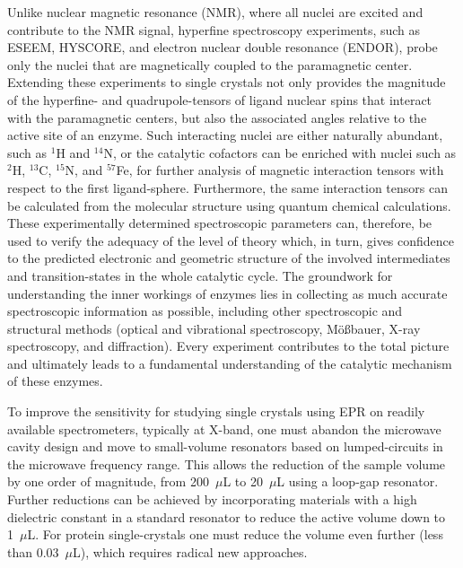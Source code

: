 Unlike nuclear magnetic resonance (NMR), where all nuclei are excited and contribute to the NMR signal, hyperfine spectroscopy experiments, such as ESEEM, HYSCORE, and electron nuclear double resonance (ENDOR), probe only the nuclei that are magnetically coupled to the paramagnetic center. Extending these experiments to single crystals not only provides the magnitude of the hyperfine- and quadrupole-tensors of ligand nuclear spins that interact with the paramagnetic centers, but also the associated angles relative to the active site of an enzyme. Such interacting nuclei are either naturally abundant, such as $^1$H and $^{14}$N, or the catalytic cofactors can be enriched with nuclei such as $^2$H, $^{13}$C, $^{15}$N, and $^{57}$Fe, for further analysis of magnetic interaction tensors with respect to the first ligand-sphere. Furthermore, the same interaction tensors can be calculated from the molecular structure using quantum chemical calculations. \cite{NEESE2003125} These experimentally determined spectroscopic parameters can, therefore, be used to verify the adequacy of the level of theory which, in turn, gives confidence to the predicted electronic and geometric structure of the involved intermediates and transition-states in the whole catalytic cycle. The groundwork for understanding the inner workings of enzymes lies in collecting as much accurate spectroscopic information as possible, including other spectroscopic and structural methods (optical and vibrational spectroscopy, M{\"o}{\ss}bauer, X-ray spectroscopy, and diffraction). Every experiment contributes to the total picture and ultimately leads to a fundamental understanding of the catalytic mechanism of these enzymes.

To improve the sensitivity for studying single crystals using EPR on readily available spectrometers, typically at X-band, one must abandon the microwave cavity design and move to small-volume resonators based on lumped-circuits in the microwave frequency range. This allows the reduction of the sample volume by one order of magnitude, from 200~$\mu$L to 20~$\mu$L using a loop-gap resonator. \cite{hydehoff} Further reductions can be achieved by incorporating materials with a high dielectric constant in a standard resonator to reduce the active volume down to 1~$\mu$L. \cite{dielectricReson1, dielectricReson2} For protein single-crystals one must reduce the volume even further (less than 0.03~$\mu$L), which requires radical new approaches.

